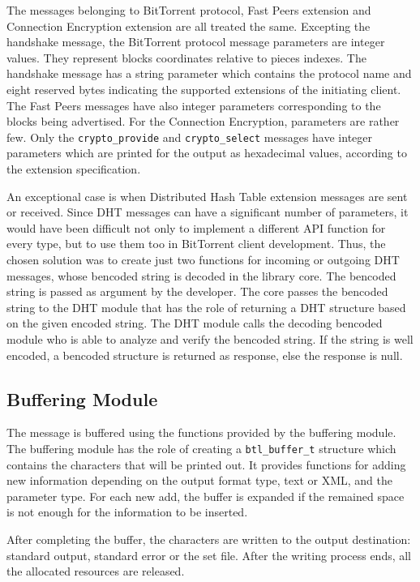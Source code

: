 The messages belonging to BitTorrent protocol, Fast Peers extension and
Connection Encryption extension are all treated the same. Excepting the
handshake message, the BitTorrent protocol message parameters are integer
values. They represent blocks coordinates relative to pieces indexes. The
handshake message has a string parameter which contains the protocol name and
eight reserved  bytes indicating the supported extensions of the initiating
client. The Fast Peers messages have also integer parameters corresponding to
the blocks being advertised. For the Connection Encryption, parameters are
rather few. Only the \texttt{crypto\_provide} and \texttt{crypto\_select}
messages have integer parameters which are printed for the output as
hexadecimal values, according to the extension specification.

An exceptional case is when Distributed Hash Table extension messages are sent
or received. Since DHT messages can have a significant number of parameters,
it would have been difficult not only to implement a different API function
for every type, but to use them too in BitTorrent client development. Thus,
the chosen solution was to create just two functions for incoming or outgoing
DHT messages, whose bencoded string is decoded in the library core. The
bencoded string is passed as argument by the developer. The core passes the
bencoded string to the DHT module that has the role of returning a DHT
structure based on the given encoded string. The DHT module calls the decoding
bencoded module who is able to analyze and verify the bencoded string. If the
string is well encoded, a bencoded structure is returned as response, else the
response is null.

\subsection{Buffering Module}

The message is buffered using the functions provided by the buffering module.
The buffering module has the role of creating a \texttt{btl\_buffer\_t}
structure which contains the characters that will be printed out. It provides
functions for adding new information depending on the output format type, text
or XML, and the parameter type. For each new add, the buffer is expanded if
the remained space is not enough for the information to be inserted.

After completing the buffer, the characters are written to the output
destination: standard output, standard error or the set file. After the
writing process ends, all the allocated resources are released.


